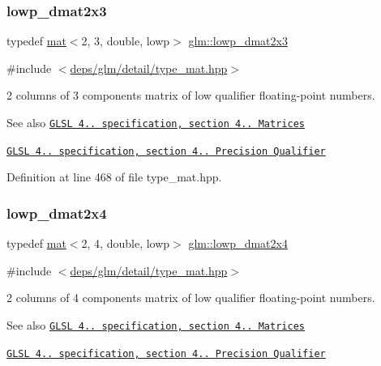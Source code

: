 \subsubsection{\texorpdfstring{lowp\+\_\+dmat2x3}{lowp\_dmat2x3}}
{\footnotesize\ttfamily typedef \hyperlink{structglm_1_1mat}{mat}$<$2, 3, double, lowp$>$ \hyperlink{group__core__precision_gae5263863de4793ff33184db9a6bd3620}{glm\+::lowp\+\_\+dmat2x3}}



{\ttfamily \#include $<$\hyperlink{type__mat_8hpp}{deps/glm/detail/type\+\_\+mat.\+hpp}$>$}

2 columns of 3 components matrix of low qualifier floating-\/point numbers.

\begin{DoxySeeAlso}{See also}
\href{http://www.opengl.org/registry/doc/GLSLangSpec.4.20.8.pdf}{\tt G\+L\+SL 4.. specification, section 4.. Matrices} 

\href{http://www.opengl.org/registry/doc/GLSLangSpec.4.20.8.pdf}{\tt G\+L\+SL 4.. specification, section 4.. Precision Qualifier} 
\end{DoxySeeAlso}


Definition at line 468 of file type\+\_\+mat.\+hpp.

\mbox{\label{group__core__precision_ga7832375b36ade5886dd947a2a378d1ac}} 
\subsubsection{\texorpdfstring{lowp\+\_\+dmat2x4}{lowp\_dmat2x4}}
{\footnotesize\ttfamily typedef \hyperlink{structglm_1_1mat}{mat}$<$2, 4, double, lowp$>$ \hyperlink{group__core__precision_ga7832375b36ade5886dd947a2a378d1ac}{glm\+::lowp\+\_\+dmat2x4}}



{\ttfamily \#include $<$\hyperlink{type__mat_8hpp}{deps/glm/detail/type\+\_\+mat.\+hpp}$>$}

2 columns of 4 components matrix of low qualifier floating-\/point numbers.

\begin{DoxySeeAlso}{See also}
\href{http://www.opengl.org/registry/doc/GLSLangSpec.4.20.8.pdf}{\tt G\+L\+SL 4.. specification, section 4.. Matrices} 

\href{http://www.opengl.org/registry/doc/GLSLangSpec.4.20.8.pdf}{\tt G\+L\+SL 4.. specification, section 4.. Precision Qualifier} 
\end{DoxySeeAlso}


